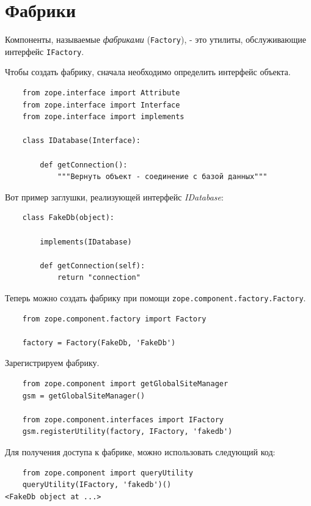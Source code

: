 \documentclass[a4paper,openany,twoside,draft]{book}
\providecommand*{\DUroletitlereference}[1]{\textsl{#1}}
\begin{document}
\section{Фабрики%
  \label{id43}%
}

Компоненты, называемые \DUroletitlereference{фабриками} (\texttt{Factory}), - это утилиты, обслуживающие интерфейс \texttt{IFactory}.

Чтобы создать фабрику, сначала необходимо определить интерфейс объекта.

\begin{verbatim}
    from zope.interface import Attribute
    from zope.interface import Interface
    from zope.interface import implements

    class IDatabase(Interface):

        def getConnection():
            """Вернуть объект - соединение с базой данных"""
\end{verbatim}

Вот пример заглушки, реализующей интерфейс \DUroletitlereference{IDatabase}:

\begin{verbatim}
    class FakeDb(object):

        implements(IDatabase)

        def getConnection(self):
            return "connection"
\end{verbatim}

Теперь можно создать фабрику при помощи \texttt{zope.component.factory.Factory}.

\begin{verbatim}
    from zope.component.factory import Factory

    factory = Factory(FakeDb, 'FakeDb')
\end{verbatim}

Зарегистрируем фабрику.

\begin{verbatim}
    from zope.component import getGlobalSiteManager
    gsm = getGlobalSiteManager()

    from zope.component.interfaces import IFactory
    gsm.registerUtility(factory, IFactory, 'fakedb')
\end{verbatim}

Для получения доступа к фабрике, можно использовать следующий код:

\begin{verbatim}
    from zope.component import queryUtility
    queryUtility(IFactory, 'fakedb')()
<FakeDb object at ...>
\end{verbatim}
\end{document}
